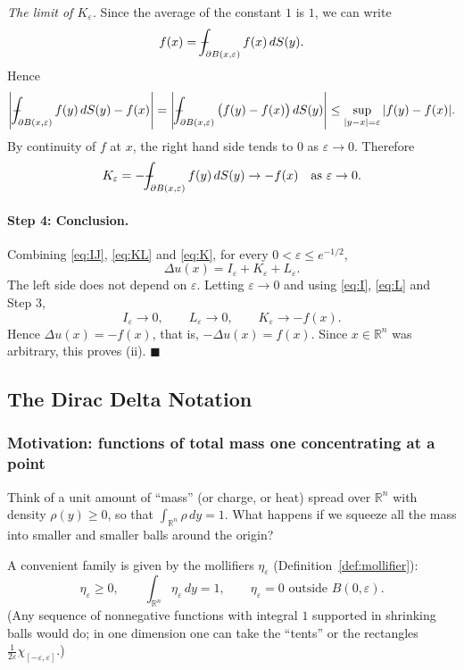 \documentclass[11pt]{article}
\def\Xint#1{\mathchoice
  {\XXint\displaystyle\textstyle{#1}}%
  {\XXint\textstyle\scriptstyle{#1}}%
  {\XXint\scriptstyle\scriptscriptstyle{#1}}%
  {\XXint\scriptscriptstyle\scriptscriptstyle{#1}}%
  \!\int}
\def\XXint#1#2#3{{\setbox0=\hbox{$#1{#2#3}{\int}$}
  \vcenter{\hbox{$#2#3$}}\kern-.5\wd0}}
\def\fint{\Xint-}
\theoremstyle{plain}
\theoremstyle{definition}
\theoremstyle{remark}
\begin{document}
\textit{The limit of $K_\varepsilon$.} Since the average of the constant $1$ is $1$, we can write
$$ f(x) = \fint_{\partial B(x,\varepsilon)} f(x)\, dS(y). $$
Hence
$$ \left| \fint_{\partial B(x,\varepsilon)} f(y)\, dS(y) - f(x) \right| = \left| \fint_{\partial B(x,\varepsilon)} \big(f(y) - f(x)\big)\, dS(y) \right| \leq \sup_{|y-x| = \varepsilon} |f(y) - f(x)|. $$
By continuity of $f$ at $x$, the right hand side tends to $0$ as $\varepsilon \to 0$. Therefore
$$ K_\varepsilon = -\fint_{\partial B(x,\varepsilon)} f(y)\, dS(y) \to -f(x) \quad \text{as } \varepsilon \to 0. $$

\paragraph{Step 4: Conclusion.} Combining \eqref{eq:IJ}, \eqref{eq:KL} and \eqref{eq:K}, for every $0 < \varepsilon \leq e^{-1/2}$,
$$ \Delta u(x) = I_\varepsilon + K_\varepsilon + L_\varepsilon. $$
The left side does not depend on $\varepsilon$. Letting $\varepsilon \to 0$ and using \eqref{eq:I}, \eqref{eq:L} and Step 3,
$$ I_\varepsilon \to 0, \qquad L_\varepsilon \to 0, \qquad K_\varepsilon \to -f(x). $$
Hence $\Delta u(x) = -f(x)$, that is, $-\Delta u(x) = f(x)$. Since $x \in \mathbb{R}^n$ was arbitrary, this proves (ii). $\blacksquare$

\subsection{The Dirac Delta Notation}\label{ssec:dirac}

\subsubsection{Motivation: functions of total mass one concentrating at a point}
Think of a unit amount of ``mass'' (or charge, or heat) spread over $\mathbb{R}^n$ with density $\rho(y) \geq 0$, so that $\int_{\mathbb{R}^n} \rho\, dy = 1$. What happens if we squeeze all the mass into smaller and smaller balls around the origin?

A convenient family is given by the mollifiers $\eta_\varepsilon$ (Definition~\ref{def:mollifier}):
$$ \eta_\varepsilon \geq 0, \qquad \int_{\mathbb{R}^n}\eta_\varepsilon\, dy = 1, \qquad \eta_\varepsilon = 0 \text{ outside } B(0,\varepsilon). $$
(Any sequence of nonnegative functions with integral $1$ supported in shrinking balls would do; in one dimension one can take the ``tents'' or the rectangles $\frac{1}{2\varepsilon}\chi_{[-\varepsilon,\varepsilon]}$.)
\end{document}
